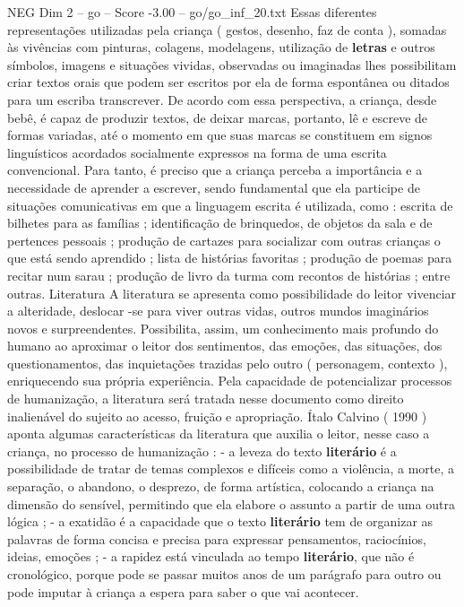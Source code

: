 \begin{textsample}{NEG Dim 2 – go – Score -3.00 – go/go\_inf\_20.txt}
Essas diferentes representações utilizadas pela criança ( gestos, desenho, faz de conta ), somadas às vivências com pinturas, colagens, modelagens, utilização de \textbf{letras} e outros símbolos, imagens e situações vividas, observadas ou imaginadas lhes possibilitam criar textos orais que podem ser escritos por ela de forma espontânea ou ditados para um escriba transcrever.
De acordo com essa perspectiva, a criança, desde bebê, é capaz de produzir textos, de deixar marcas, portanto, lê e escreve de formas variadas, até o momento em que suas marcas se constituem em signos linguísticos acordados socialmente expressos na forma de uma escrita convencional.
Para tanto, é preciso que a criança perceba a importância e a necessidade de aprender a escrever, sendo fundamental que ela participe de situações comunicativas em que a linguagem escrita é utilizada, como : escrita de bilhetes para as famílias ; identificação de brinquedos, de objetos da sala e de pertences pessoais ; produção de cartazes para socializar com outras crianças o que está sendo aprendido ; lista de histórias favoritas ; produção de poemas para recitar num sarau ; produção de livro da turma com recontos de histórias ; entre outras.
Literatura A literatura se apresenta como possibilidade do leitor vivenciar a alteridade, deslocar -se para viver outras vidas, outros mundos imaginários novos e surpreendentes.
Possibilita, assim, um conhecimento mais profundo do humano ao aproximar o leitor dos sentimentos, das emoções, das situações, dos questionamentos, das inquietações trazidas pelo outro ( personagem, contexto ), enriquecendo sua própria experiência.
Pela capacidade de potencializar processos de humanização, a literatura será tratada nesse documento como direito inalienável do sujeito ao acesso, fruição e apropriação.
Ítalo Calvino ( 1990 ) aponta algumas características da literatura que auxilia o leitor, nesse caso a criança, no processo de humanização : - a leveza do texto \textbf{literário} é a possibilidade de tratar de temas complexos e difíceis como a violência, a morte, a separação, o abandono, o desprezo, de forma artística, colocando a criança na dimensão do sensível, permitindo que ela elabore o assunto a partir de uma outra lógica ; - a exatidão é a capacidade que o texto \textbf{literário} tem de organizar as palavras de forma concisa e precisa para expressar pensamentos, raciocínios, ideias, emoções ; - a rapidez está vinculada ao tempo \textbf{literário}, que não é cronológico, porque pode se passar muitos anos de um parágrafo para outro ou pode imputar à criança a espera para saber o que vai acontecer.

\end{textsample}
